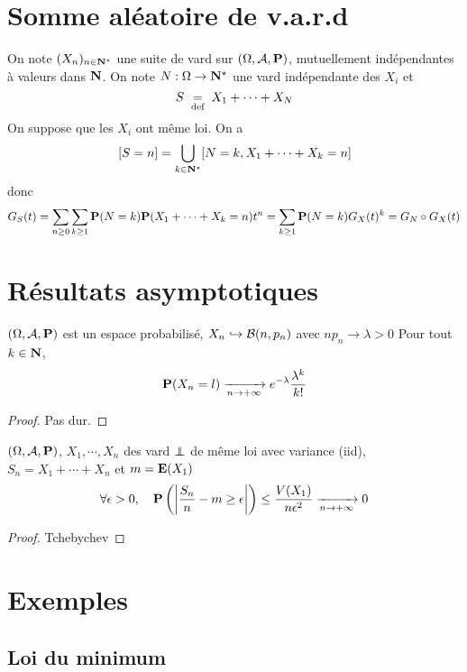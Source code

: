 \section{Somme aléatoire de v.a.r.d}

On note $(X_n)_{n\in \N^\star}$ une suite de vard sur $(\Omega, \mathcal  A, \P)$, mutuellement indépendantes à valeurs dans $\N$. On note $N:\Omega\to \N^\star$ une vard indépendante des $X_i$ et  \[
    S\defeq X_1+\cdots +X_N
\] 
On suppose que les $X_i$ ont même loi. On a  \[
    [S=n]=\bigcup_{k \in  \N^\star}[N=k,X_1+\cdots +X_k=n]
\] 
donc \[
    G_S(t)= \sum_{n\geq 0}\sum_{k\geq 1} \P(N=k)\P(X_1+\cdots +X_k=n)t^n=\sum_{k\geq 1}\P(N=k)G_X(t)^k =G_N\circ G_X(t)
\] 

\section{Résultats asymptotiques}

\begin{prop}
    \Hyp $(\Omega, \mathcal  A, \P)$ est un espace probabilisé, $X_n\suit \mathcal  B(n, p_n)$ avec $np_n \to  \lambda>0$
    \Conc Pour tout $ k\in \N$, \[
        \P(X_n=l) \xrightarrow[n\to+\infty]{}e^{-\lambda}\frac{\lambda^k}{k!}
    \]
\end{prop}

\begin{proof}
    Pas dur.
\end{proof}

\begin{thm}
    \Hyp $(\Omega, \mathcal  A, \P)$, $X_1,\cdots , X_n$ des vard $\indep$ de même loi avec variance (iid\footnotemark), $S_n=X_1+\cdots +X_n$ et $m=\E(X_1)$
    \Conc \[
        \forall  \epsilon>0,\quad \P\left( \left| \frac{S_n}{n}-m\geq \epsilon \right| \right) \leq \frac{V(X_1)}{n\epsilon^2} \xrightarrow[n\to+\infty]{}0
    \] 
\end{thm}

\begin{proof}
Tchebychev
\end{proof}

\section{Exemples}

\subsection{Loi du minimum}

